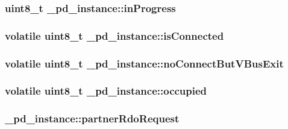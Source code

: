 \hypertarget{struct__pd__instance_af4167196731cf1a846f23c4d6473181c}{
\subsubsection[{in\-Progress}]{\setlength{\rightskip}{0pt plus 5cm}uint8\-\_\-t \-\_\-pd\-\_\-instance\-::in\-Progress}}\label{struct__pd__instance_af4167196731cf1a846f23c4d6473181c}
\hypertarget{struct__pd__instance_aefbe7a5da39f65fa52efdc9cbae4d9cc}{
\subsubsection[{is\-Connected}]{\setlength{\rightskip}{0pt plus 5cm}volatile uint8\-\_\-t \-\_\-pd\-\_\-instance\-::is\-Connected}}\label{struct__pd__instance_aefbe7a5da39f65fa52efdc9cbae4d9cc}
\hypertarget{struct__pd__instance_abb01fbdcfbc66eba6c7d5d85e91e62e4}{
\subsubsection[{no\-Connect\-But\-V\-Bus\-Exit}]{\setlength{\rightskip}{0pt plus 5cm}volatile uint8\-\_\-t \-\_\-pd\-\_\-instance\-::no\-Connect\-But\-V\-Bus\-Exit}}\label{struct__pd__instance_abb01fbdcfbc66eba6c7d5d85e91e62e4}
\hypertarget{struct__pd__instance_a4649287fd50df5de2602a502655f7bb2}{
\subsubsection[{occupied}]{\setlength{\rightskip}{0pt plus 5cm}volatile uint8\-\_\-t \-\_\-pd\-\_\-instance\-::occupied}}\label{struct__pd__instance_a4649287fd50df5de2602a502655f7bb2}
\hypertarget{struct__pd__instance_ad8cdcafc4b643a8f147febada1cd5704}{
\subsubsection[{partner\-Rdo\-Request}]{ \-\_\-pd\-\_\-instance\-::partner\-Rdo\-Request}}\label{struct__pd__instance_ad8cdcafc4b643a8f147febada1cd5704}

